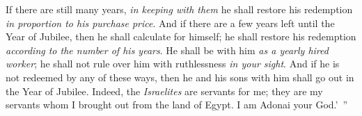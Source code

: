\begin{biblechapter}
\verse If there are still many years, \textit{in keeping with them} he shall restore his redemption \textit{in proportion to his purchase price}.
\verse And if there are a few years left until the Year of Jubilee, then he shall calculate for himself; he shall restore his redemption \textit{according to the number of his years}.
\verse He shall be with him \textit{as a yearly hired worker}; he shall not rule over him with ruthlessness \textit{in your sight}.
\verse And if he is not redeemed by any of these ways, then he and his sons with him shall go out in the Year of Jubilee.
\verse Indeed, the \textit{Israelites} are servants for me; they are my servants whom I brought out from the land of Egypt. I am Adonai your God.’ ”
\end{biblechapter}

